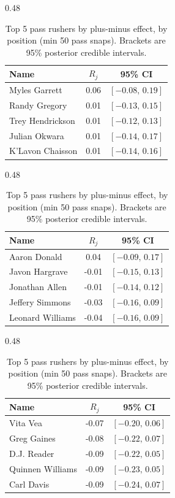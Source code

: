 \begin{table}[h!]
\centering
\begin{subtable}{0.48\textwidth}
\centering
\footnotesize
\begin{tabular}{lcc}
\toprule
Name & $R_j$ & 95\% CI \\
\midrule
Myles Garrett & 0.06 & $[-0.08,\,0.19]$ \\
Randy Gregory & 0.01 & $[-0.13,\,0.15]$ \\
Trey Hendrickson & 0.01 & $[-0.12,\,0.13]$ \\
Julian Okwara & 0.01 & $[-0.14,\,0.17]$ \\
K'Lavon Chaisson & 0.01 & $[-0.14,\,0.16]$ \\
\bottomrule
\end{tabular}
\caption{Edge}
\end{subtable}
\hfill
\begin{subtable}{0.48\textwidth}
\centering
\footnotesize
\begin{tabular}{lcc}
\toprule
Name & $R_j$ & 95\% CI \\
\midrule
Aaron Donald & 0.04 & $[-0.09,\,0.17]$ \\
Javon Hargrave & -0.01 & $[-0.15,\,0.13]$ \\
Jonathan Allen & -0.01 & $[-0.14,\,0.12]$ \\
Jeffery Simmons & -0.03 & $[-0.16,\,0.09]$ \\
Leonard Williams & -0.04 & $[-0.16,\,0.09]$ \\
\bottomrule
\end{tabular}
\caption{DT}
\end{subtable}

\bigskip
\begin{subtable}{0.48\textwidth}
\centering
\footnotesize
\begin{tabular}{lcc}
\toprule
Name & $R_j$ & 95\% CI \\
\midrule
Vita Vea & -0.07 & $[-0.20,\,0.06]$ \\
Greg Gaines & -0.08 & $[-0.22,\,0.07]$ \\
D.J. Reader & -0.09 & $[-0.22,\,0.05]$ \\
Quinnen Williams & -0.09 & $[-0.23,\,0.05]$ \\
Carl Davis & -0.09 & $[-0.24,\,0.07]$ \\
\bottomrule
\end{tabular}
\caption{NT}
\end{subtable}
\caption{Top 5 pass rushers by plus-minus effect, by position (min 50 pass snaps). Brackets are 95\% posterior credible intervals.}
\label{tab:rusher_pm_top}
\end{table}
